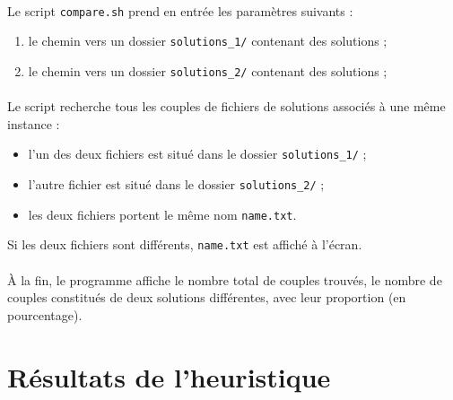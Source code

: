 \paragraph{}
Le script \texttt{compare.sh} prend en entrée les paramètres suivants :
\begin{enumerate}
\item le chemin vers un dossier \texttt{solutions\_1/} contenant des solutions ;
\item le chemin vers un dossier \texttt{solutions\_2/} contenant des solutions ;
\end{enumerate}
\paragraph{}
Le script recherche tous les couples de fichiers de solutions associés à une même instance :
\begin{itemize}
\item l'un des deux fichiers est situé dans le dossier \texttt{solutions\_1/} ;
\item l'autre fichier est situé dans le dossier \texttt{solutions\_2/} ;
\item les deux fichiers portent le même nom \texttt{name.txt}.
\end{itemize}
Si les deux fichiers sont différents, \texttt{name.txt} est affiché à l'écran.
\paragraph{}
À la fin, le programme affiche le nombre total de couples trouvés, le nombre de couples constitués de deux solutions différentes,
avec leur proportion (en pourcentage).

\newpage


\section{Résultats de l'heuristique}

